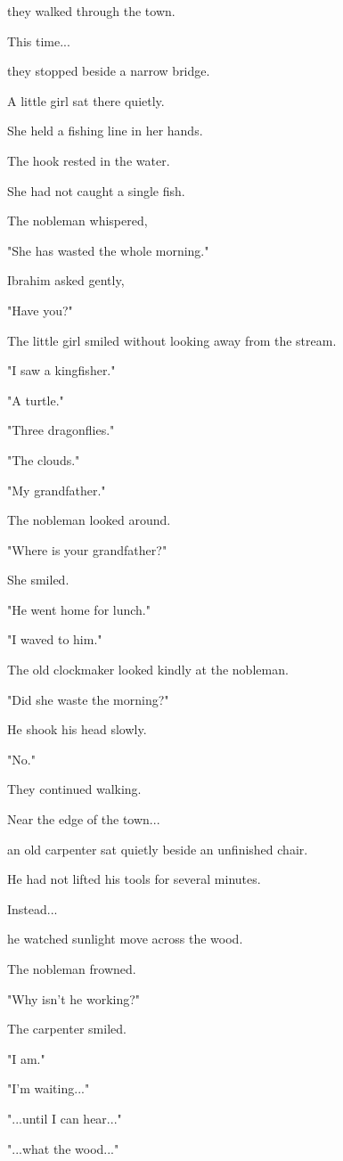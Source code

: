 \documentclass[12pt,openany]{book}
\begin{document}
they walked through the town.

This time...

they stopped beside a narrow bridge.

A little girl sat there quietly.

She held a fishing line in her hands.

The hook rested in the water.

She had not caught a single fish.

The nobleman whispered,

"She has wasted the whole morning."

Ibrahim asked gently,

"Have you?"

The little girl smiled without looking away from the stream.

"I saw a kingfisher."

"A turtle."

"Three dragonflies."

"The clouds."

"My grandfather."

The nobleman looked around.

"Where is your grandfather?"

She smiled.

"He went home for lunch."

"I waved to him."

The old clockmaker looked kindly at the nobleman.

"Did she waste the morning?"

He shook his head slowly.

"No."

They continued walking.

Near the edge of the town...

an old carpenter sat quietly beside an unfinished chair.

He had not lifted his tools for several minutes.

Instead...

he watched sunlight move across the wood.

The nobleman frowned.

"Why isn't he working?"

The carpenter smiled.

"I am."

"I'm waiting..."

"...until I can hear..."

"...what the wood..."
\end{document}
